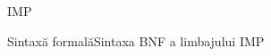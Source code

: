 \documentclass[xcolor=pdftex,romanian,colorlinks]{beamer}
\begin{document}
\begin{subsection}{IMP}
\begin{comment}
\alert{\renewcommand{\syntaxKeyword}{}\syntax[\Stmt]{\color{black}\Sif\;\terminal{(}\BExp\terminal{)}\Block\Selse\Block}{}
	\syntaxCont[\Stmt]{\color{black}\Id \terminal{=}\AExp\terminal{;}}{}}
   \item Categorii sintactice (neterminale, încep cu majusculă)
   \begin{itemize}
    \item descriu tipurile de sintaxă
     \begin{itemize}
      \item Tipuri lexicale: %
	  \item Tipuri construite:
     \end{itemize}
   \end{itemize}
   \item Cuvinte cheie (terminale, încep cu literă mică sau simboluri)
   \begin{itemize}
    \item descriu elementele lexicale:
   $\Sif$, $\Selse$, $\Sint$,
   $\Swhile$,
   $\terminal{<=}$,
   $\terminal{\&\&}$, $\terminal{!}$,
   $\terminal{+}$, $\terminal{=}$, $\terminal{;}$, $\terminal{(}$, $\terminal{)}$, \ldots
   \end{itemize}
  \end{itemize}
 \end{frame}
\end{comment}
\begin{frame}{Sintaxă formală}{Sintaxa BNF a limbajului IMP}
\vspace{-5ex}\begin{syntaxBlock}{\AExp}
\alert{
\begin{itemize}
\item[]\renewcommand{\syntaxKeyword}{}
\syntax{\Int\Smid\Id}{}
\syntaxCont{\AExp\terminal{+}\AExp\Smid\AExp\terminal{*}\AExp\Smid\AExp\terminal{/}\AExp}{}
\item[]\renewcommand{\defSort}{\BExp}
\syntax{\Bool}{}
\syntaxCont{\AExp\terminal{<=}\AExp}{}
\syntaxCont{\Snot\BExp \Smid \BExp \terminal{\&\&} \BExp}{}
\item[]\renewcommand{\defSort}{\Block}
\syntax{\terminal{\{}\Stmt\terminal{\}} \Smid \terminal{\{}\terminal{\}}}{}
\syntaxCont{\Stmt\terminal{}\Stmt}{}
\syntaxCont{\Id\terminal{=}\AExp\terminal{;}}{}
\syntaxCont{\Sif\;\terminal{(}\BExp\terminal{)}\Block\Selse\Block}{}
\syntaxCont{\Swhile\;\terminal{(}\BExp\terminal{)}\Block}{}
\item[]\renewcommand{\defSort}{\Pgm}
\syntax{\Sint \Id \terminal{=} \Int \terminal{;} \Pgm\Smid \Stmt}{}
\end{itemize}
}
\end{syntaxBlock}
\end{frame}
\end{subsection}
\end{document}
